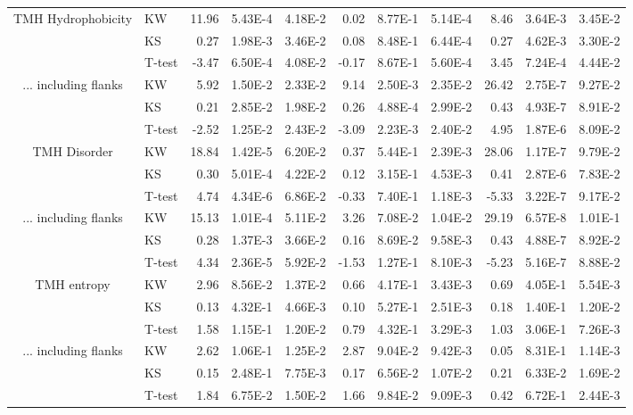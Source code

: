 \begin{table}[htbp]
\begin{tabular}{clrrrrrrrrr}
		\midrule
		\multirow{3}[0]{*}{TMH Hydrophobicity} &  KW & 11.96 & 5.43E-4 & 4.18E-2 & 0.02  & 8.77E-1 & 5.14E-4 & 8.46  & 3.64E-3 & 3.45E-2 \\
								&  KS & 0.27  & 1.98E-3 & 3.46E-2 & 0.08  & 8.48E-1 & 6.44E-4 & 0.27  & 4.62E-3 & 3.30E-2 \\
								&  T-test & -3.47 & 6.50E-4 & 4.08E-2 & -0.17 & 8.67E-1 & 5.60E-4 & 3.45  & 7.24E-4 & 4.44E-2 \\
		\midrule
		\multirow{3}[0]{*}{... including flanks} &  KW & 5.92  & 1.50E-2 & 2.33E-2 & 9.14  & 2.50E-3 & 2.35E-2 & 26.42 & 2.75E-7 & 9.27E-2 \\
								&  KS & 0.21  & 2.85E-2 & 1.98E-2 & 0.26  & 4.88E-4 & 2.99E-2 & 0.43  & 4.93E-7 & 8.91E-2 \\
								&  T-test & -2.52 & 1.25E-2 & 2.43E-2 & -3.09 & 2.23E-3 & 2.40E-2 & 4.95  & 1.87E-6 & 8.09E-2 \\
	  \midrule
		\multirow{3}[0]{*}{TMH Disorder} &  KW & 18.84 & 1.42E-5 & 6.20E-2 & 0.37  & 5.44E-1 & 2.39E-3 & 28.06 & 1.17E-7 & 9.79E-2 \\
								&  KS & 0.30  & 5.01E-4 & 4.22E-2 & 0.12  & 3.15E-1 & 4.53E-3 & 0.41 & 2.87E-6 & 7.83E-2 \\
								&  T-test & 4.74  & 4.34E-6 & 6.86E-2 & -0.33 & 7.40E-1 & 1.18E-3 & -5.33 & 3.22E-7 & 9.17E-2 \\
		\midrule
		\multirow{3}[0]{*}{... including flanks} &  KW & 15.13 & 1.01E-4 & 5.11E-2 & 3.26  & 7.08E-2 & 1.04E-2 & 29.19 & 6.57E-8 & 1.01E-1 \\
								&  KS & 0.28  & 1.37E-3 & 3.66E-2 & 0.16  & 8.69E-2 & 9.58E-3 & 0.43 & 4.88E-7 & 8.92E-2 \\
								&  T-test & 4.34  & 2.36E-5 & 5.92E-2 & -1.53 & 1.27E-1 & 8.10E-3 & -5.23 & 5.16E-7 & 8.88E-2 \\
		\midrule
		\multirow{3}[0]{*}{TMH entropy} &  KW & 2.96  & 8.56E-2 & 1.37E-2 & 0.66  & 4.17E-1 & 3.43E-3 & 0.69  & 4.05E-1 & 5.54E-3 \\
								&  KS & 0.13  & 4.32E-1 & 4.66E-3 & 0.10  & 5.27E-1 & 2.51E-3 & 0.18 & 1.40E-1 & 1.20E-2 \\
								&  T-test & 1.58  & 1.15E-1 & 1.20E-2 & 0.79  & 4.32E-1 & 3.29E-3 & 1.03 & 3.06E-1 & 7.26E-3 \\
		\midrule
		\multirow{3}[0]{*}{... including flanks} &  KW & 2.62  & 1.06E-1 & 1.25E-2 & 2.87  & 9.04E-2 & 9.42E-3 & 0.05 & 8.31E-1 & 1.14E-3 \\
								&  KS & 0.15  & 2.48E-1 & 7.75E-3 & 0.17  & 6.56E-2 & 1.07E-2 & 0.21 & 6.33E-2 & 1.69E-2 \\
								&  T-test & 1.84  & 6.75E-2 & 1.50E-2 & 1.66  & 9.84E-2 & 9.09E-3 & 0.42 & 6.72E-1 & 2.44E-3 \\
		\end{tabular}%
						\label{table:organellesswissstats}
		\end{table}%


